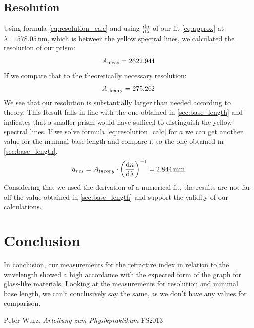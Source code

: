 \documentclass{scrreprt}
\newcommand{\unit}[1]{\ensuremath{\, \mathrm{#1}}}
\begin{document}
\subsection{Resolution}
Using formula \ref{eq:resolution_calc} and using $\frac{\dif{n}}{\dif{\lambda}}$ of our fit \ref{eq:approx} at $\lambda = 578.05 \unit{nm}$, which is between the yellow spectral lines, we calculated the resolution of our prism:
\begin{equation}
	A_{\text{meas}} = 2622.944
	\notag
\end{equation}
If we compare that to the theoretically necessary resolution:
\begin{equation}
	A_{\text{theory}} = 275.262
	\notag
\end{equation}
We see that our resolution is substantially larger than needed according to theory. This Result falls in line with the one obtained in \ref{sec:base_length} and indicates that a smaller prism would have sufficed to distinguish the yellow spectral lines. If we solve formula \ref{eq:resolution_calc} for $a$ we can get another value for the minimal base length and compare it to the one obtained in \ref{sec:base_length}.
\begin{equation}
	a_{res} = A_{theory} \cdot \left(\frac{\dif{n}}{\dif{\lambda}}\right)^{-1} = 2.844 \unit{mm}
\notag
\end{equation}
Considering that we used the derivation of a numerical fit, the results are not far off the value obtained in \ref{sec:base_length} and support the validity of our calculations.

\section{Conclusion}
In conclusion, our measurements for the refractive index in relation to the wavelength showed a high accordance with the expected form of the graph for glass-like materials. Looking at the measurements for resolution and minimal base length, we can't conclusively say the same, as we don't have any values for comparison. 

\begin{thebibliography}{9}

  Peter Wurz,
  \emph{Anleitung zum Physikpraktikum}
  FS2013

\end{thebibliography}
\end{document}
